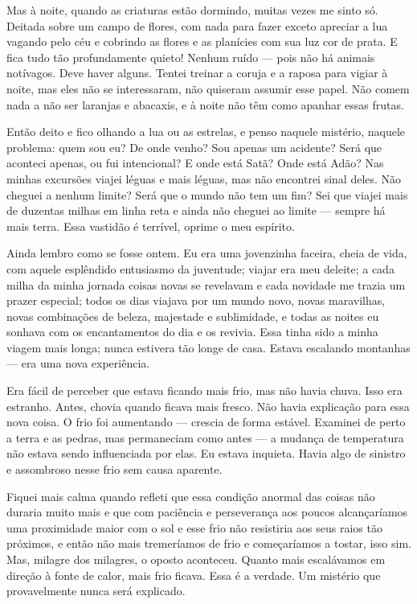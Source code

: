 Mas à noite, quando as criaturas estão dormindo, muitas vezes me sinto só. Deitada
sobre um campo de flores, com nada para fazer exceto apreciar a lua vagando pelo
céu e cobrindo as flores e as planícies com sua luz cor de prata. E fica tudo tão
profundamente quieto! Nenhum ruído --- pois não há animais notívagos. Deve haver
alguns. Tentei treinar a coruja e a raposa para vigiar à noite, mas eles
não se interessaram, não quiseram assumir esse papel. Não comem nada a não ser
laranjas e abacaxis, e à noite não têm como apanhar essas frutas.

Então deito e fico olhando a lua ou as estrelas, e penso naquele
mistério, naquele problema: quem sou eu? De onde venho? Sou apenas um acidente?
Será que aconteci apenas, ou fui intencional? E onde está Satã? Onde está Adão? Nas
minhas excursões viajei léguas e mais léguas, mas não encontrei sinal deles.
Não cheguei a nenhum limite? Será que o mundo não tem um fim? Sei que viajei mais
de duzentas milhas em linha reta e ainda não cheguei ao limite --- sempre há mais
terra. Essa vastidão é terrível, oprime o meu espírito.

Ainda lembro como se fosse ontem. Eu era uma jovenzinha faceira, cheia de vida, com
aquele esplêndido entusiasmo da juventude; viajar era meu deleite; a cada milha da
minha jornada coisas novas se revelavam e cada novidade me trazia um prazer
especial; todos os dias viajava por um mundo novo, novas maravilhas, novas
combinações de beleza, majestade e sublimidade, e todas as noites eu sonhava com
os encantamentos do dia e os revivia. Essa tinha sido a minha viagem
mais longa; nunca estivera tão longe de casa. Estava escalando
montanhas --- era uma nova experiência.

 Era fácil de perceber que estava ficando mais frio, mas não havia chuva.
Isso era estranho. Antes, chovia quando ficava mais fresco. Não havia explicação
para essa nova coisa. O frio foi aumentando --- crescia de forma estável. Examinei
de perto a terra e as pedras, mas permaneciam como antes --- a mudança de
temperatura não estava sendo influenciada por elas. Eu estava inquieta. Havia algo
de sinistro e assombroso nesse frio sem causa aparente.

Fiquei mais calma quando refleti que essa condição anormal das coisas não duraria muito mais
e que com paciência e perseverança aos poucos alcançaríamos uma proximidade
maior com o sol e esse frio não resistiria aos seus raios tão próximos, e então
não mais tremeríamos de frio e começaríamos a tostar, isso sim. Mas, milagre dos
milagres, o oposto aconteceu. Quanto mais escalávamos em direção à fonte de calor,
mais frio ficava. Essa é a verdade. Um mistério que provavelmente
nunca será explicado.

